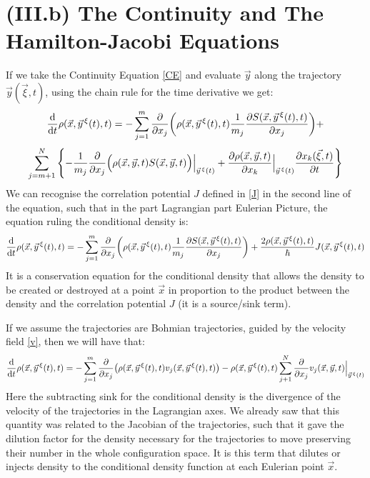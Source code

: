 \documentclass[11pt, a4paper]{article} %
\begin{document}
\section*{(III.b) The Continuity and The Hamilton-Jacobi Equations\vspace{-0.3cm}}
If we take the Continuity Equation \eqref{CE} and evaluate $\vec{y}$ along the trajectory $\vec{y}(\vec{\xi},t)$, using the chain rule for the time derivative we get:
\begin{equation}
\dv{}{t}\rho(\vec{x},\vec{y}^{\, \xi}(t),t)=-\sum_{j=1}^m\pdv{}{x_j}\qty(\rho(\vec{x}, \vec{y}^{\, \xi}(t), t) \frac{1}{m_j}\pdv{S(\vec{x}, \vec{y}^{\, \xi}(t), t)}{x_j}) + \vspace{-0.2cm}
\end{equation}
$$
\sum_{j=m+1}^N\qty{ -\frac{1}{m_j}\pdv{}{x_j}\Big(\rho(\vec{x},\vec{y},t)S(\vec{x}, \vec{y}, t)\Big)\Big\rvert_{\vec{y}^{\, \xi}(t)}+\pdv{\rho(\vec{x}, \vec{y}, t)}{x_k}\Big\rvert_{\vec{y}^{\, \xi}(t)} \pdv{x_k(\vec{\xi},t)}{t}}
$$
We can recognise the correlation potential $J$ defined in \eqref{J} in the second line of the equation, such that in the part Lagrangian part Eulerian Picture, the equation ruling the conditional density is:
\begin{equation}\label{CE.EL}
\dv{}{t}\rho(\vec{x},\vec{y}^{\, \xi}(t),t)=-\sum_{j=1}^m\pdv{}{x_j}\qty(\rho(\vec{x}, \vec{y}^{\, \xi}(t), t) \frac{1}{m_j}\pdv{S(\vec{x}, \vec{y}^{\, \xi}(t), t)}{x_j}) + \frac{2\rho(\vec{x},\vec{y}^{\, \xi}(t),t)}{\hbar}J(\vec{x},\vec{y}^{\, \xi}(t),t)
\end{equation}
It is a conservation equation for the conditional density that allows the density to be created or destroyed at a point $\vec{x}$ in proportion to the product between the density and the correlation potential $J$ (it is a source/sink term).

If we assume the trajectories are Bohmian trajectories, guided by the velocity field \eqref{v}, then we will have that:\vspace{-0.1cm}
\begin{equation}\label{CE.EL.Bohm}
\dv{}{t}\rho(\vec{x},\vec{y}^{\, \xi}(t),t)=-\sum_{j=1}^m\pdv{}{x_j}\qty(\rho(\vec{x}, \vec{y}^{\, \xi}(t), t) v_j(\vec{x}, \vec{y}^{\, \xi}(t),t)) - \rho(\vec{x},\vec{y}^{\, \xi}(t),t)\sum_{j+1}^N \pdv{}{x_j}v_j(\vec{x}, \vec{y},t)\Big\rvert_{\vec{y}^{\, \xi}(t)}\vspace{-0.1cm}
\end{equation}
 Here the subtracting sink for the conditional density is the divergence of the velocity of the trajectories in the Lagrangian axes. We already saw that this quantity was related to the Jacobian of the trajectories, such that it gave the dilution factor for the density necessary for the trajectories to move preserving their number in the whole configuration space. It is this term that dilutes or injects density to the conditional density function at each Eulerian point $\vec{x}$.
\end{document}
